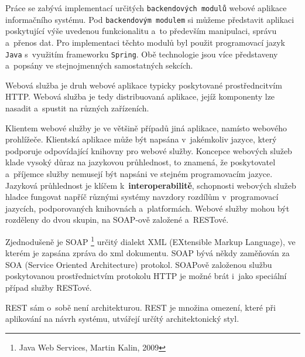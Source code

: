 \documentclass[12pt]{article}
\begin{document}
{Práce se zabývá implementací určitých \texttt{backendových modulů} webové aplikace informačního systému. Pod \texttt{backendovým modulem} si můžeme představit aplikaci
poskytující výše uvedenou funkcionalitu a~to především manipulaci, správu a~přenos dat.
Pro implementaci těchto modulů byl použit programovací jazyk \texttt{Java} s~využitím frameworku \texttt{Spring}. Obě technologie jsou více představeny a~popsány ve stejnojmenných samostatných sekcích.




Webová služba
je druh webové aplikace typicky poskytované prostředncitvím HTTP. 
Webová služba je tedy distribuovaná aplikace, jejíž komponenty lze nasadit a~spustit na různých zařízeních. 

Klientem webové služby je ve většině případů jiná aplikace, namísto webového prohlížeče.
Klientská aplikace může být napsána v~jakémkoliv jazyce, který podporuje
odpovídající knihovny pro webové služby.
Koncepce webových služeb klade vysoký důraz na jazykovou průhlednost, 
to znamená, že poskytovatel a~příjemce služby nemusejí být napsáni
ve stejném programovacím jazyce. 
Jazyková průhlednost je klíčem k~\textbf{interoperabilitě}, schopnosti webových služeb hladce fungovat napříč různými systémy navzdory rozdílům v~programovací jazycích,
podporovaných knihovnách a~platformách.
Webové služby mohou být rozděleny do dvou skupin, na SOAP-ově založené a~RESTové.


Zjednodušeně je SOAP \footnote{Java Web Services, Martin Kalin, 2009}  určitý dialekt XML
(EXtensible Markup Language), ve kterém je zapsána zpráva do xml dokumentu.
SOAP bývá někdy zaměňován za SOA (Service Oriented Architecture) protokol.
SOAPově založenou službu poskytovanou prostřednictvím protokolu HTTP je možné brát i~jako speciální případ služby RESTové.




REST sám o~sobě není architekturou. REST je množina omezení,
které při aplikování na návrh systému, utvářejí určítý architektonický styl. 

\bigskip

}
\end{document}
